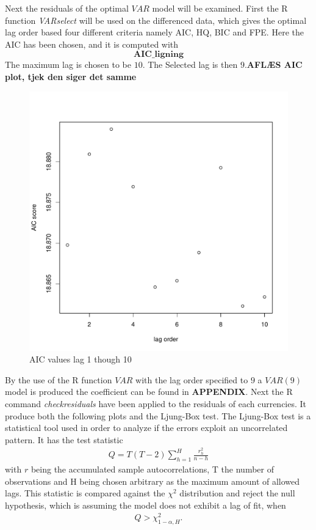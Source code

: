\noindent Next the residuals of the optimal $VAR$ model will be examined. First the R function \textit{VARselect} will be used on the differenced data, which gives the optimal lag order based four different criteria namely AIC, HQ, BIC and FPE. Here the AIC has been chosen, and it is computed with
\begin{equation*}
    \textbf{AIC\_ligning}
\end{equation*}
The maximum lag is chosen to be $10$. The Selected lag is then $9$.\textbf{AFLÆS AIC plot, tjek den siger det samme}\\
\begin{figure}[H]
    \centering
    \includegraphics[width=0.5\linewidth]{1.Projekt_kode/Billeder/AIC_diffed_VAR.pdf}
    \caption{AIC values lag 1 though 10}
    \label{fig:enter-label}
\end{figure}
By the use of the R function $VAR$ with the lag order specified to $9$ a $VAR(9)$ model is produced the coefficient can be found in \textbf{APPENDIX}. Next the R command \textit{checkresiduals} have been applied to the residuals of each currencies. It produce both the following plots and the Ljung-Box test. The Ljung-Box test is a statistical tool used in order to analyze if the errors exploit an uncorrelated pattern. It has the test statistic 
\begin{align*}
    Q=T(T-2)\sum^H_{h=1}\frac{r^2_{h}}{n-h}
\end{align*}
with $r$ being the accumulated sample autocorrelations, T the number of observations and H being chosen arbitrary as the maximum amount of allowed lags. This statistic is compared against the $\chi^2$ distribution and reject the null hypothesis, which is assuming the model does not exhibit a lag of fit, when
\begin{align*}
    Q>\chi^2_{1-\alpha,H}.
\end{align*}


